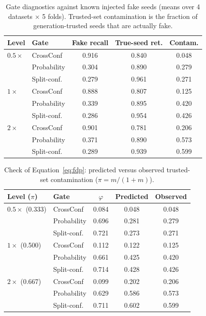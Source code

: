 \documentclass[10pt]{article} %
\begin{document}
\begin{table}[t]
\caption{Gate diagnostics against known injected fake seeds (means over 4 datasets $\times$ 5 folds). Trusted-set contamination is the fraction of generation-trusted seeds that are actually fake.}
\label{tab:gate}
\begin{center}
\begin{tabular}{llccc}
\toprule
Level & Gate & Fake recall & True-seed ret. & Contam. \\
\midrule
$0.5\times$ & CrossConf & 0.916 & 0.840 & 0.048 \\
 & Probability & 0.304 & 0.890 & 0.279 \\
 & Split-conf. & 0.279 & 0.961 & 0.271 \\
$1\times$ & CrossConf & 0.888 & 0.807 & 0.125 \\
 & Probability & 0.339 & 0.895 & 0.420 \\
 & Split-conf. & 0.286 & 0.954 & 0.426 \\
$2\times$ & CrossConf & 0.901 & 0.781 & 0.206 \\
 & Probability & 0.371 & 0.890 & 0.573 \\
 & Split-conf. & 0.289 & 0.939 & 0.599 \\
\bottomrule
\end{tabular}
\end{center}
\end{table}

\begin{table}[t]
\caption{Check of Equation~\ref{eq:fdp}: predicted versus observed trusted-set contamination ($\pi = m/(1+m)$).}
\label{tab:fdp}
\begin{center}
\begin{tabular}{llccc}
\toprule
Level ($\pi$) & Gate & $\varphi$ & Predicted & Observed \\
\midrule
$0.5\times$ (0.333) & CrossConf & 0.084 & 0.048 & 0.048 \\
 & Probability & 0.696 & 0.281 & 0.279 \\
 & Split-conf. & 0.721 & 0.273 & 0.271 \\
$1\times$ (0.500) & CrossConf & 0.112 & 0.122 & 0.125 \\
 & Probability & 0.661 & 0.425 & 0.420 \\
 & Split-conf. & 0.714 & 0.428 & 0.426 \\
$2\times$ (0.667) & CrossConf & 0.099 & 0.202 & 0.206 \\
 & Probability & 0.629 & 0.586 & 0.573 \\
 & Split-conf. & 0.711 & 0.602 & 0.599 \\
\bottomrule
\end{tabular}
\end{center}
\end{table}
\end{document}
